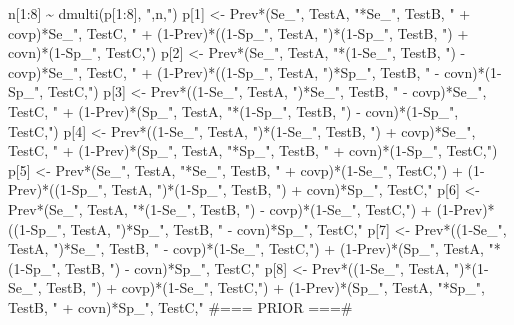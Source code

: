 \documentclass[
]{book}
\newenvironment{Shaded}{\begin{snugshade}}{\end{snugshade}}
\newcommand{\NormalTok}[1]{#1}
\newcommand{\StringTok}[1]{\textcolor[rgb]{0.31,0.60,0.02}{#1}}
\begin{document}
\begin{Shaded}
\begin{Highlighting}[]
\StringTok{  n[1:8] \textasciitilde{} dmulti(p[1:8], "}\NormalTok{,n,}\StringTok{")}
\StringTok{  p[1] \textless{}{-} Prev*(Se\_"}\NormalTok{, TestA, }\StringTok{"*Se\_"}\NormalTok{, TestB, }\StringTok{" + covp)*Se\_"}\NormalTok{, TestC, }\StringTok{" + (1{-}Prev)*((1{-}Sp\_"}\NormalTok{, TestA, }\StringTok{")*(1{-}Sp\_"}\NormalTok{, TestB, }\StringTok{") + covn)*(1{-}Sp\_"}\NormalTok{, TestC,}\StringTok{")}
\StringTok{  p[2] \textless{}{-} Prev*(Se\_"}\NormalTok{, TestA, }\StringTok{"*(1{-}Se\_"}\NormalTok{, TestB, }\StringTok{") {-} covp)*Se\_"}\NormalTok{, TestC, }\StringTok{" + (1{-}Prev)*((1{-}Sp\_"}\NormalTok{, TestA, }\StringTok{")*Sp\_"}\NormalTok{, TestB, }\StringTok{" {-} covn)*(1{-}Sp\_"}\NormalTok{, TestC,}\StringTok{")}
\StringTok{  p[3] \textless{}{-} Prev*((1{-}Se\_"}\NormalTok{, TestA, }\StringTok{")*Se\_"}\NormalTok{, TestB, }\StringTok{" {-} covp)*Se\_"}\NormalTok{, TestC, }\StringTok{" + (1{-}Prev)*(Sp\_"}\NormalTok{, TestA, }\StringTok{"*(1{-}Sp\_"}\NormalTok{, TestB, }\StringTok{") {-} covn)*(1{-}Sp\_"}\NormalTok{, TestC,}\StringTok{")}
\StringTok{  p[4] \textless{}{-} Prev*((1{-}Se\_"}\NormalTok{, TestA, }\StringTok{")*(1{-}Se\_"}\NormalTok{, TestB, }\StringTok{") + covp)*Se\_"}\NormalTok{, TestC, }\StringTok{" + (1{-}Prev)*(Sp\_"}\NormalTok{, TestA, }\StringTok{"*Sp\_"}\NormalTok{, TestB, }\StringTok{" + covn)*(1{-}Sp\_"}\NormalTok{, TestC,}\StringTok{")}
\StringTok{  }
\StringTok{  p[5] \textless{}{-} Prev*(Se\_"}\NormalTok{, TestA, }\StringTok{"*Se\_"}\NormalTok{, TestB, }\StringTok{" + covp)*(1{-}Se\_"}\NormalTok{, TestC,}\StringTok{") + (1{-}Prev)*((1{-}Sp\_"}\NormalTok{, TestA, }\StringTok{")*(1{-}Sp\_"}\NormalTok{, TestB, }\StringTok{") + covn)*Sp\_"}\NormalTok{, TestC,}\StringTok{"}
\StringTok{  p[6] \textless{}{-} Prev*(Se\_"}\NormalTok{, TestA, }\StringTok{"*(1{-}Se\_"}\NormalTok{, TestB, }\StringTok{") {-} covp)*(1{-}Se\_"}\NormalTok{, TestC,}\StringTok{") + (1{-}Prev)*((1{-}Sp\_"}\NormalTok{, TestA, }\StringTok{")*Sp\_"}\NormalTok{, TestB, }\StringTok{" {-} covn)*Sp\_"}\NormalTok{, TestC,}\StringTok{"}
\StringTok{  p[7] \textless{}{-} Prev*((1{-}Se\_"}\NormalTok{, TestA, }\StringTok{")*Se\_"}\NormalTok{, TestB, }\StringTok{" {-} covp)*(1{-}Se\_"}\NormalTok{, TestC,}\StringTok{") + (1{-}Prev)*(Sp\_"}\NormalTok{, TestA, }\StringTok{"*(1{-}Sp\_"}\NormalTok{, TestB, }\StringTok{") {-} covn)*Sp\_"}\NormalTok{, TestC,}\StringTok{"}
\StringTok{  p[8] \textless{}{-} Prev*((1{-}Se\_"}\NormalTok{, TestA, }\StringTok{")*(1{-}Se\_"}\NormalTok{, TestB, }\StringTok{") + covp)*(1{-}Se\_"}\NormalTok{, TestC,}\StringTok{") + (1{-}Prev)*(Sp\_"}\NormalTok{, TestA, }\StringTok{"*Sp\_"}\NormalTok{, TestB, }\StringTok{" + covn)*Sp\_"}\NormalTok{, TestC,}\StringTok{"}
\StringTok{  }
\StringTok{  }
\StringTok{\#=== PRIOR  ===\#}


\end{Highlighting}
\end{Shaded}
\end{document}

